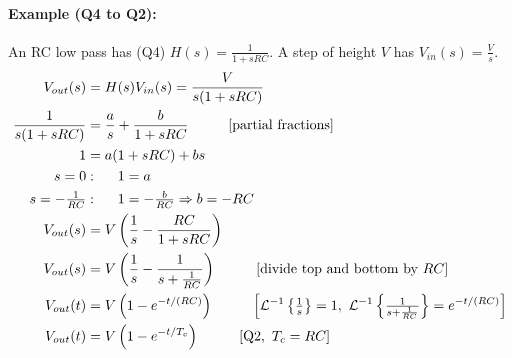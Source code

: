 \paragraph{Example (Q4 to Q2):} An RC low pass has (Q4)
\(H(s) = \frac{1}{1 + sRC}\). A step of height \(V\) has
\(V_{in}(s) = \frac{V}{s}\).
\begin{align*}
  V_{out}(s) &= H(s) V_{in}(s) = \frac{V}{s(1 + sRC)} \\
  \frac{1}{s(1 + sRC)} &= \frac{a}{s} + \frac{b}{1 + sRC} \hspace{1cm} [\text{partial fractions}] \\
  1 &= a(1 + sRC) + b s \\
  s = 0 &: \hspace{0.5cm} 1 = a \\
  s = -\tfrac{1}{RC} &: \hspace{0.5cm} 1 = -\tfrac{b}{RC} \Rightarrow b = -RC \\
  V_{out}(s) &= V\left(\frac{1}{s} - \frac{RC}{1 + sRC}\right) \\
  V_{out}(s) &= V\left(\frac{1}{s} - \frac{1}{s + \frac{1}{RC}}\right) \hspace{1cm} [\text{divide top and bottom by } RC] \\
  V_{out}(t) &= V\left(1 - e^{-t/(RC)}\right) \hspace{1cm} \left[\mathcal{L}^{-1}\left\{\tfrac{1}{s}\right\} = 1,\ \mathcal{L}^{-1}\left\{\tfrac{1}{s + \frac{1}{RC}}\right\} = e^{-t/(RC)}\right] \\
  V_{out}(t) &= V\left(1 - e^{-t/T_c}\right) \hspace{1cm} [\text{Q2}, \ T_c = RC]
\end{align*}

